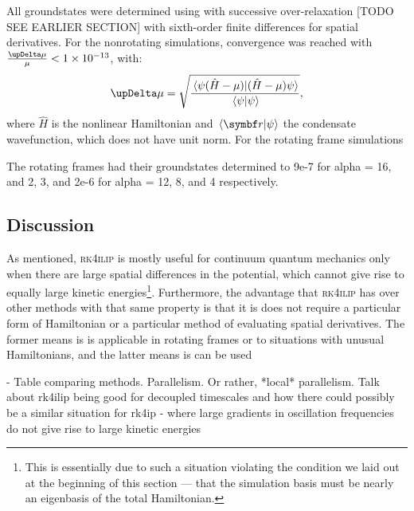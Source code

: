 All groundstates were determined using with successive over-relaxation [TODO SEE EARLIER SECTION] with sixth-order finite differences for spatial derivatives. For the nonrotating simulations, convergence was reached with $\frac{\upDelta\mu}{\mu} < 1\E{-13}$, with:
\begin{equation}
\upDelta\mu = \sqrt{\frac{\braket{\psi(\hat H - \mu)} {(\hat H - \mu)\psi}}{\braket {\psi}{\psi}}},
\end{equation}
where $\hat H$ is the nonlinear Hamiltonian and $\braket{\vec r}{\psi}$ the condensate wavefunction, which does not have unit norm. For the rotating frame simulations

The rotating frames had their groundstates determined to 9e-7 for alpha = 16, and 2, 3, and 2e-6  for alpha = 12, 8, and 4 respectively.

\subsection{Discussion}

As mentioned, \textsc{rk4ilip} is mostly useful for continuum quantum mechanics only when there are large spatial differences in the potential, which cannot give rise to equally large kinetic energies\footnote{This is essentially due to such a situation violating the condition we laid out at the beginning of this section --- that the simulation basis must be nearly an eigenbasis of the total Hamiltonian.}. Furthermore, the advantage that \textsc{rk4ilip} has over other methods with that same property is that it is does not require a particular form of Hamiltonian or a particular method of evaluating spatial derivatives. The former means is is applicable in rotating frames or to situations with unusual Hamiltonians, and the latter means is can be used

- Table comparing methods. Parallelism. Or rather, *local* parallelism. Talk about rk4ilip being good for decoupled timescales and how there could possibly be a similar situation for rk4ip - where large gradients in oscillation frequencies do not give rise to large kinetic energies


